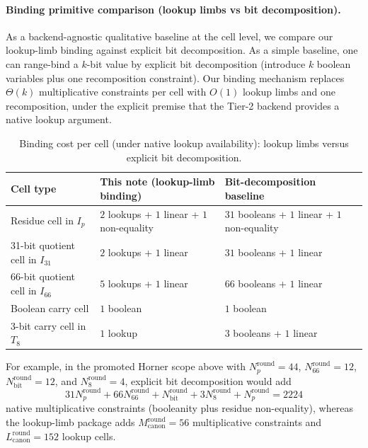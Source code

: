 ﻿\documentclass[11pt]{article}
\begin{document}
\paragraph{Binding primitive comparison (lookup limbs vs bit decomposition).}
As a backend-agnostic qualitative baseline at the cell level, we compare our
lookup-limb binding against explicit bit decomposition.
As a simple baseline, one can range-bind a \(k\)-bit value by explicit bit
decomposition (introduce \(k\) boolean variables plus one recomposition
constraint). Our binding mechanism replaces \(\Theta(k)\) multiplicative
constraints per cell with \(O(1)\) lookup limbs and one recomposition, under
the explicit premise that the Tier-2 backend provides a native lookup argument.

\begin{table}[t]
\centering
\small
\setlength{\tabcolsep}{6pt}
\begin{tabular}{|l|l|l|}
\hline
Cell type & This note (lookup-limb binding) & Bit-decomposition baseline \\
\hline
Residue cell in \(I_p\) & \(2\) lookups + \(1\) linear + \(1\) non-equality & \(31\) booleans + \(1\) linear + \(1\) non-equality \\
31-bit quotient cell in \(I_{31}\) & \(2\) lookups + \(1\) linear & \(31\) booleans + \(1\) linear \\
66-bit quotient cell in \(I_{66}\) & \(5\) lookups + \(1\) linear & \(66\) booleans + \(1\) linear \\
Boolean carry cell & \(1\) boolean & \(1\) boolean \\
3-bit carry cell in \(T_8\) & \(1\) lookup & \(3\) booleans + \(1\) linear \\
\hline
\end{tabular}
\caption{Binding cost per cell (under native lookup availability): lookup limbs
versus explicit bit decomposition.}
\label{tab:binding-vs-bitdecomp}
\end{table}

For example, in the promoted Horner scope above with
\(N_p^{\mathrm{round}}=44\),
\(N_{66}^{\mathrm{round}}=12\),
\(N_{\mathrm{bit}}^{\mathrm{round}}=12\), and
\(N_8^{\mathrm{round}}=4\),
explicit bit decomposition would add
\[
31N_p^{\mathrm{round}} + 66N_{66}^{\mathrm{round}} + N_{\mathrm{bit}}^{\mathrm{round}} + 3N_8^{\mathrm{round}} + N_p^{\mathrm{round}} = 2224
\]
native multiplicative constraints (booleanity plus residue non-equality),
whereas the lookup-limb package adds
\(M_{\mathrm{canon}}^{\mathrm{round}}=56\) multiplicative constraints and
\(L_{\mathrm{canon}}^{\mathrm{round}}=152\) lookup cells.
\end{document}
